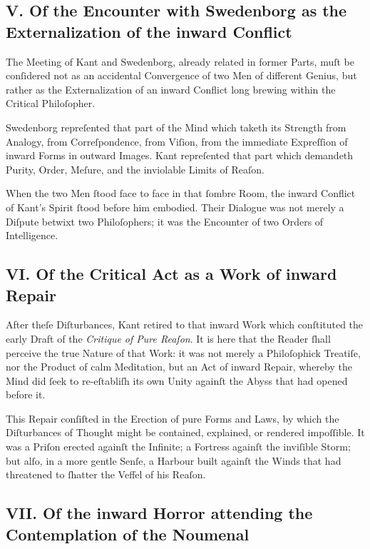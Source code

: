 \documentclass[12pt]{article}
\begin{document}
\subsection*{V. Of the Encounter with Swedenborg as the Externalization of the inward Conflict}

The Meeting of Kant and Swedenborg, already related in former Parts, muſt be 
conſidered not as an accidental Convergence of two Men of different Genius, but 
rather as the Externalization of an inward Conflict long brewing within the 
Critical Philoſopher.

Swedenborg repreſented that part of the Mind which taketh its Strength from 
Analogy, from Correſpondence, from Viſion, from the immediate Expreſſion of 
inward Forms in outward Images. Kant repreſented that part which demandeth 
Purity, Order, Meſure, and the inviolable Limits of Reaſon.

When the two Men ſtood face to face in that ſombre Room, the inward Conflict 
of Kant’s Spirit ſtood before him embodied. Their Dialogue was not merely a 
Diſpute betwixt two Philoſophers; it was the Encounter of two Orders of 
Intelligence.

\subsection*{VI. Of the Critical Act as a Work of inward Repair}

After theſe Diſturbances, Kant retired to that inward Work which conſtituted 
the early Draft of the \textit{Critique of Pure Reaſon}. It is here that the Reader 
ſhall perceive the true Nature of that Work: it was not merely a Philoſophick 
Treatiſe, nor the Product of calm Meditation, but an Act of inward Repair, 
whereby the Mind did ſeek to re-eſtabliſh its own Unity againſt the Abyss that 
had opened before it.

This Repair conſiſted in the Erection of pure Forms and Laws, by which the 
Diſturbances of Thought might be contained, explained, or rendered impoſſible. 
It was a Priſon erected againſt the Infinite; a Fortress againſt the 
inviſible Storm; but alſo, in a more gentle Senſe, a Harbour built againſt the 
Winds that had threatened to ſhatter the Veffel of his Reaſon.

\subsection*{VII. Of the inward Horror attending the Contemplation of the Noumenal}
\end{document}
